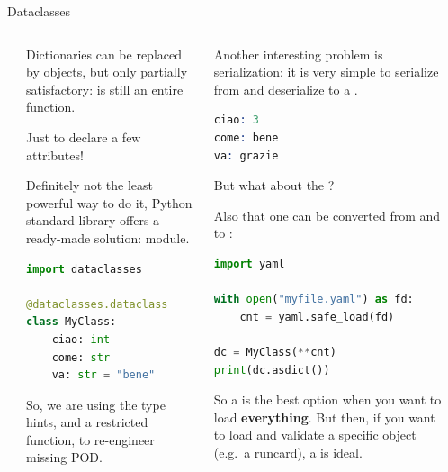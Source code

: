 \documentclass[9pt]{beamer}
\begin{document}
\begin{frame}[fragile]{Dataclasses}
    \begin{columns}
        \begin{column}{0.03\textwidth}
        \end{column}
        \begin{column}{0.47\textwidth}
            Dictionaries can be replaced by objects, but only partially
            satisfactory:  is still an entire function. 
            \begin{flushright}
                \footnotesize
                Just to declare a few attributes!
            \end{flushright}
            \vspace*{10pt}

            Definitely not the least powerful way to do it, Python standard
            library offers a ready-made solution:
            \href{https://docs.python.org/3/library/dataclasses.html}{}
            module.

            \begin{lstlisting}[language=Python,style=mystyle]
import dataclasses

@dataclasses.dataclass
class MyClass:
    ciao: int
    come: str
    va: str = "bene"\end{lstlisting}

            So, we are using the type hints, and a restricted
             function, to re-engineer missing POD.
        \end{column}
        \begin{column}{0.47\textwidth}
            Another interesting problem is serialization: it is very simple to
            serialize from and deserialize to a .

            \begin{lstlisting}[language=Prolog,style=mystyle]
ciao: 3
come: bene
va: grazie\end{lstlisting}
            
            But what about the ?

            Also that one can be converted from and to :
            \begin{lstlisting}[language=Python,style=mystyle]
import yaml

with open("myfile.yaml") as fd:
    cnt = yaml.safe_load(fd)

dc = MyClass(**cnt)
print(dc.asdict())\end{lstlisting}

            So a  is the best option when you want to load \textbf{everything}.
            But then, if you want to load and validate a specific object (e.g.\
            a runcard), a  is ideal.
        \end{column}
        \begin{column}{0.03\textwidth}
        \end{column}
    \end{columns}
\end{frame}
\end{document}
